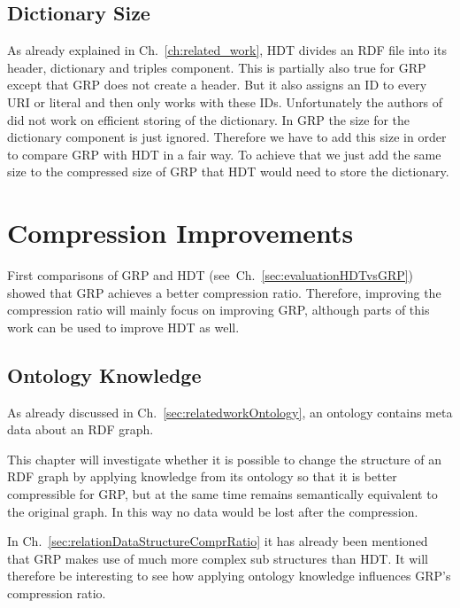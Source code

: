 \subsection{Dictionary Size}


As already explained in Ch.~\ref{ch:related_work}, HDT divides an RDF file into its header, dictionary and triples component. This is partially also true for GRP except that GRP does not create a header. But it also assigns an ID to every URI or literal and then only works with these IDs. Unfortunately the authors of~\cite{maneth} did not work on efficient storing of the dictionary. In GRP the size for the dictionary component is just ignored. Therefore we have to add this size in order to compare GRP with HDT in a fair way. To achieve that we just add the same size to the compressed size of GRP that HDT would need to store the dictionary.


\section{Compression Improvements}\label{sec:approachComprRatioImprovements}

First comparisons of GRP and HDT (see~Ch.~\ref{sec:evaluationHDTvsGRP}) showed that GRP achieves a better compression ratio. Therefore, improving the compression ratio will mainly focus on improving GRP, although parts of this work can be used to improve HDT as well. 



\subsection{Ontology Knowledge}\label{sec:approachOntKnowledge}

As already discussed in Ch.~\ref{sec:relatedworkOntology}, an ontology contains meta data about an RDF graph.

This chapter will investigate whether it is possible to change the structure of an RDF graph by applying knowledge from its ontology so that it is better compressible for GRP, but at the same time remains semantically equivalent to the original graph. In this way no data would be lost after the compression.

In Ch.~\ref{sec:relationDataStructureComprRatio} it has already been mentioned that GRP makes use of much more complex sub structures than HDT. It will therefore be interesting to see how applying ontology knowledge influences GRP's compression ratio.

